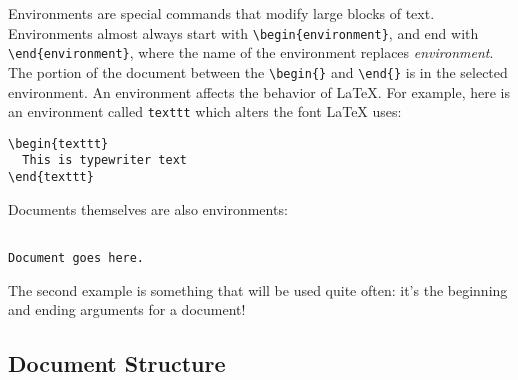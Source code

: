 Environments are special commands that modify large blocks of text.
Environments almost always start with \verb=\begin{environment}=, and
  end with \verb=\end{environment}=, where the name of the environment
replaces \textit{environment}.  The portion of the document between
the \verb=\begin{}= and \verb=\end{}= is in the selected environment.
An environment affects the behavior of \LaTeX{}.  For example, here is
an environment called \texttt{texttt} which alters the font \LaTeX{}
uses:
\begin{verbatim}
\begin{texttt}
  This is typewriter text
\end{texttt}
\end{verbatim}

Documents themselves are also environments:
\begin{verbatim}

Document goes here.

\end{verbatim}

The second example is something that will be used quite often: it's
the beginning and ending arguments for a document!

\subsection{Document Structure}
\label{sec:document-structure}

